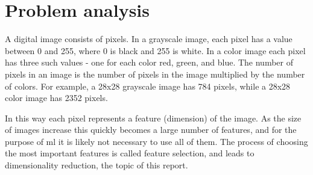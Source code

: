 \chapter{Problem analysis}\label{cha:problem-analysis}
A digital image consists of pixels. In a grayscale image, each pixel has a value between 0 and 255, where 0 is black and 255 is white. In a color image each pixel has three such values - one for each color red, green, and blue. The number of pixels in an image is the number of pixels in the image multiplied by the number of colors. For example, a 28x28 grayscale image has 784 pixels, while a 28x28 color image has 2352 pixels.

In this way each pixel represents a feature (dimension) of the image. As the size of images increase this quickly becomes a large number of features, and for the purpose of \gls{ml} it is likely not necessary to use all of them. The process of choosing the most important features is called feature selection, and leads to dimensionality reduction, the topic of this report.







